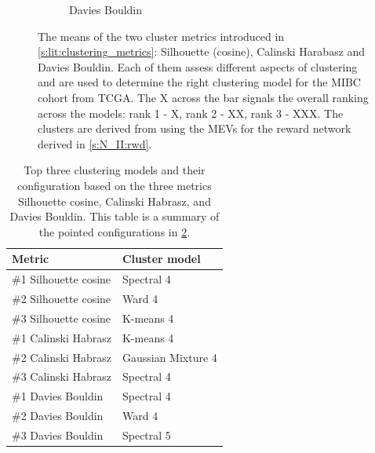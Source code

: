 \begin{figure}[H]
\begin{subfigure}[!t]{1.0\textwidth}
        \caption{Davies Bouldin}
        \label{fig:ap:n_II:dav_boul}
    \end{subfigure}
    \caption[Clustering analysis for the healthy reward network]{The means of the two cluster metrics introduced in \cref{s:lit:clustering_metrics}: Silhouette (cosine), Calinski Harabasz and Davies Bouldin. Each of them assess different aspects of clustering and are used to determine the right clustering model for the MIBC cohort from TCGA. The X across the bar signals the overall ranking across the models: rank 1 - X, rank 2 - XX, rank 3 - XXX. The clusters are derived from using the MEVs for the reward network derived in \cref{s:N_II:rwd}.}
    \label{fig:ap:n_II:cluster_metrics}
\end{figure}


\begin{table}[h!]
    \centering
    \begin{tabular}{|p{6cm}|p{6cm}|}
        \hline
        \textbf{Metric} & \textbf{Cluster model} \\
        \hline
        \#1 Silhouette cosine & \rule{0pt}{2.5ex} Spectral 4 \\
        \hline
        \#2 Silhouette cosine & \rule{0pt}{2.5ex} Ward 4 \\
        \hline
        \#3 Silhouette cosine & \rule{0pt}{2.5ex} K-means 4 \\
        \hline
        \#1 Calinski Habrasz & \rule{0pt}{2.5ex} K-means 4 \\
        \hline
        \#2 Calinski Habrasz & \rule{0pt}{2.5ex} Gaussian Mixture 4 \\
        \hline
        \#3 Calinski Habrasz & \rule{0pt}{2.5ex} Spectral 4 \\
        \hline
        \#1 Davies Bouldin & \rule{0pt}{2.5ex} Spectral 4 \\
        \hline
        \#2 Davies Bouldin & \rule{0pt}{2.5ex} Ward 4 \\
        \hline
        \#3 Davies Bouldin & \rule{0pt}{2.5ex} Spectral 5 \\
        \hline
    \end{tabular}
    \caption[Top performing clustering model]{Top three clustering models and their configuration based on the three metrics Silhouette cosine, Calinski Habrasz, and Davies Bouldin. This table is a summary of the pointed configurations in \cref{fig:ap:n_II:cluster_metrics}.}
    \label{tab:ap:N:II:top_3_cs}
\end{table}

